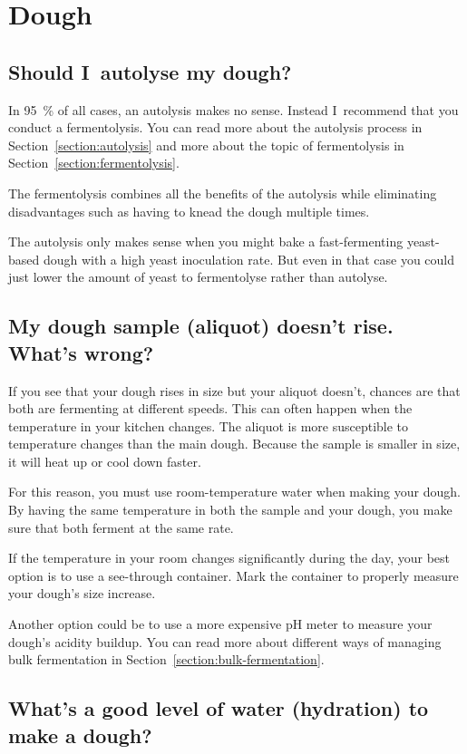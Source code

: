 \section{Dough}
\subsection{Should I~autolyse my dough?}

In \qty{95}{\percent} of all cases, an autolysis
makes no sense. Instead I~recommend
that you conduct a fermentolysis. You
can read more about the autolysis process in
Section~\ref{section:autolysis} and
more about the topic of fermentolysis
in Section~\ref{section:fermentolysis}.

The fermentolysis combines all the benefits
of the autolysis while eliminating disadvantages
such as having to knead the dough multiple times.

The autolysis only makes sense when you might
bake a fast-fermenting yeast-based dough with a
high yeast inoculation rate. But even in that
case you could just lower the amount of yeast
to fermentolyse rather than autolyse.

\subsection{My dough sample (aliquot) doesn't rise. What's wrong?}

If you see that your dough rises in size but your aliquot doesn't, chances
are that both are fermenting at different speeds. This can often
happen when the temperature in your kitchen changes. The aliquot
is more susceptible to temperature changes than the main dough.
Because the sample is smaller in size, it will heat up or cool down
faster.

For this reason, you must use room-temperature water when
making your dough. By having the same temperature in both the sample
and your dough, you make sure that both ferment at the same rate.

If the temperature in your room changes significantly during the day, your
best option is to use a see-through container. Mark the container to properly
measure your dough's size increase.

Another option could be to use a more expensive pH meter to measure your
dough's acidity buildup. You can read more about different ways of managing
bulk fermentation in Section~\ref{section:bulk-fermentation}.

\subsection{What's a good level of water (hydration) to make a dough?}

